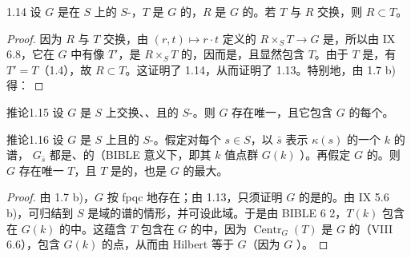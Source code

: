 \begin{SGAresult}{}{1.14}
设 $G$ 是在 $S$ 上的 $S$-，$T$ 是 $G$ 的，$R$ 是 $G$ 的。若 $T$ 与 $R$ 交换，则 $R\subset T$。
\end{SGAresult}
\begin{proof}
因为 $R$ 与 $T$ 交换，由 $(r,t)\mapsto r\cdot t$ 定义的 $R\times_S T\to G$ 是，所以由 IX 6.8，它在 $G$ 中有像 $T'$，是 $R\times_S T$ 的，因而是，且显然包含 $T$。由于 $T$ 是，有 $T'=T$（1.4），故 $R\subset T$。这证明了 1.14，从而证明了 1.13。特别地，由 1.7 b) 得：
\end{proof}
\begin{SGAresult}{推论}{1.15}
设 $G$ 是 $S$ 上交换、、且的 $S$-。则 $G$ 存在唯一，且它包含 $G$ 的每个。
\end{SGAresult}
\begin{SGAresult}{推论}{1.16}
设 $G$ 是 $S$ 上且的 $S$-。假定对每个 $s\in S$，以 $\bar s$ 表示 $\kappa(s)$ 的一个 $k$ 的谱， $G_{\bar s}$ 都是、的（BIBLE 意义下，即其 $k$ 值点群 $G(k)$ ）。再假定 $G$ 的。则 $G$ 存在唯一 $T$，且 $T$ 是的，也是 $G$ 的最大。
\end{SGAresult}
\begin{proof}
由 1.7 b)，$G$ 按 fpqc 地存在；由 1.13，只须证明 $G$ 的是的。由 IX 5.6 b)，可归结到 $S$ 是域的谱的情形，并可设此域。于是由 BIBLE 6  2，$T(k)$ 包含在 $G(k)$ 的中。这蕴含 $T$ 包含在 $G$ 的中，因为 $\operatorname{Centr}_G(T)$ 是 $G$ 的（VIII 6.6），包含 $G(k)$ 的点，从而由 Hilbert 等于 $G$（因为 $G$ ）。
\end{proof}
